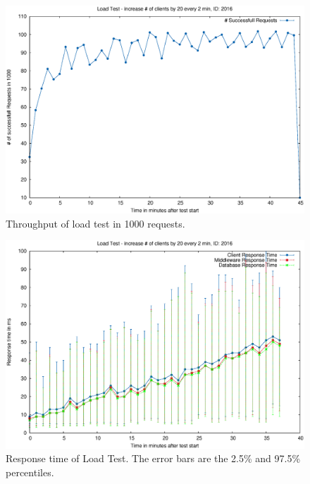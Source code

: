 \documentclass[milestone1.tex]{subfiles}
\begin{document}
\begin{figure}[H]
        \begin{center}
    \includegraphics[scale=0.5]{../exported_plots/LoadTest/2016_NrOfGoodRequests.eps}
  \end{center}
  \caption{Throughput of load test in 1000 requests.}
  \label{fig:LoadTestThrougput}
\end{figure}

\begin{figure}[H]
        \begin{center}
    \includegraphics[scale=0.5]{../exported_plots/LoadTest/2016_ResponseTime.eps}
  \end{center}
  \caption{Response time of Load Test. The error bars are the 2.5\% and 97.5\% percentiles.}
  \label{fig:LoadTestResponseTime}
\end{figure}
\end{document}
